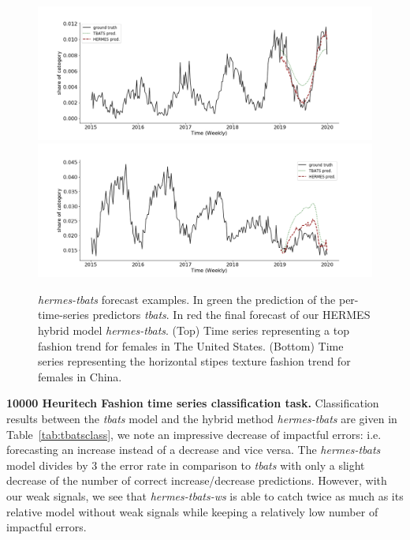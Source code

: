 \documentclass[review]{elsarticle}
\begin{document}
\begin{figure}
\centering
  \includegraphics[width=1.\linewidth]{figure/us_female_top}
  \includegraphics[width=1.\linewidth]{figure/cn_female_texture_horizontalstripe}
\caption{\textit{hermes-tbats} forecast examples. In green the prediction of the per-time-series predictors \textit{tbats}. In red the final forecast of our HERMES hybrid model \textit{hermes-tbats}. (Top) Time series representing a top fashion trend for females in The United States. (Bottom) Time series representing the horizontal stipes texture fashion trend for females in China.}
\label{fig:examples}
\end{figure}

\textbf{10000 Heuritech Fashion time series classification task. } Classification results between the \textit{tbats} model and the hybrid method \textit{hermes-tbats} are given in Table~\ref{tab:tbatsclass}, we note an impressive decrease of impactful errors: i.e. forecasting an increase instead of a decrease and vice versa. The \textit{hermes-tbats} model divides by 3 the error rate in comparison to \textit{tbats} with only a slight decrease of the number of correct increase/decrease predictions. However, with our weak signals, we see that \textit{hermes-tbats-ws} is able to catch twice as much as its relative model without weak signals while keeping a relatively low number of impactful errors.
\end{document}
